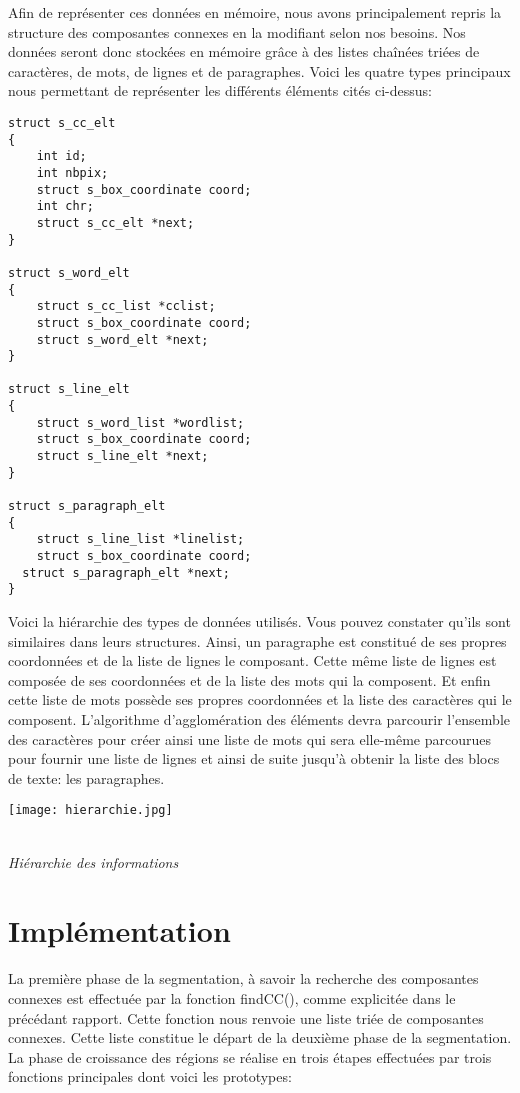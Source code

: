 \documentclass[a4paper,10pt]{report}
\begin{document}
Afin de représenter ces données en mémoire, nous avons principalement repris la
structure des composantes connexes en la modifiant selon nos besoins. Nos données seront
donc stockées en mémoire grâce à des listes chaînées triées de caractères, de mots, de
lignes et de paragraphes. Voici les quatre types principaux nous permettant de représenter
les différents éléments cités ci-dessus:

\begin{lstlisting}
struct s_cc_elt
{
    int id;
    int nbpix;
    struct s_box_coordinate coord;
    int chr;
    struct s_cc_elt *next;
}

struct s_word_elt
{
    struct s_cc_list *cclist;
    struct s_box_coordinate coord;
    struct s_word_elt *next;
}

struct s_line_elt
{
    struct s_word_list *wordlist;
    struct s_box_coordinate coord;
    struct s_line_elt *next;
}

struct s_paragraph_elt
{
    struct s_line_list *linelist;
    struct s_box_coordinate coord;
  struct s_paragraph_elt *next;
}
\end{lstlisting}


Voici la hiérarchie des types de données utilisés. Vous pouvez constater qu'ils sont
similaires dans leurs structures. Ainsi, un paragraphe est constitué de ses propres
coordonnées et de la liste de lignes le composant. Cette même liste de lignes est composée
de ses coordonnées et de la liste des mots qui la composent. Et enfin cette liste de mots
possède ses propres coordonnées et la liste des caractères qui le composent. L'algorithme 
d'agglomération des éléments devra parcourir l'ensemble des caractères pour
créer ainsi une liste de mots qui sera elle-même parcourues pour fournir une liste de lignes
et ainsi de suite jusqu'à obtenir la liste des blocs de texte: les paragraphes.

\begin{center}
  \texttt{[image: hierarchie.jpg]}
  \caption{\\\emph{Hi\'erarchie des informations}}
\end{center}



\section{Impl\'ementation}

La première phase de la segmentation, à savoir la recherche des composantes connexes
est effectuée par la fonction findCC(), comme explicitée dans le précédant rapport. Cette
fonction nous renvoie une liste triée de composantes connexes. Cette liste constitue le
départ de la deuxième phase de la segmentation. La phase de croissance des régions se
réalise en trois étapes effectuées par trois fonctions principales dont voici les prototypes:
\end{document}
